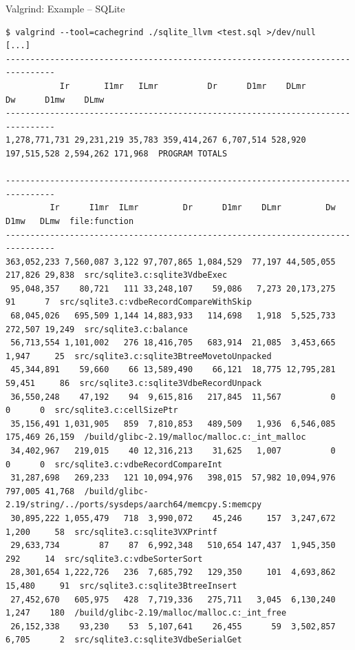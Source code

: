 \documentclass{beamer}
\begin{document}
\begin{frame}[fragile]{Valgrind: Example -- SQLite}
  \begin{lrbox}{\myv}
    \begin{minipage}{\textwidth}
\begin{verbatim}
$ valgrind --tool=cachegrind ./sqlite_llvm <test.sql >/dev/null
[...]
--------------------------------------------------------------------------------
           Ir       I1mr   ILmr          Dr      D1mr    DLmr          Dw      D1mw    DLmw
--------------------------------------------------------------------------------
1,278,771,731 29,231,219 35,783 359,414,267 6,707,514 528,920 197,515,528 2,594,262 171,968  PROGRAM TOTALS
 
--------------------------------------------------------------------------------
         Ir      I1mr  ILmr         Dr      D1mr    DLmr         Dw    D1mw   DLmw  file:function
--------------------------------------------------------------------------------
363,052,233 7,560,087 3,122 97,707,865 1,084,529  77,197 44,505,055 217,826 29,838  src/sqlite3.c:sqlite3VdbeExec
 95,048,357    80,721   111 33,248,107    59,086   7,273 20,173,275      91      7  src/sqlite3.c:vdbeRecordCompareWithSkip
 68,045,026   695,509 1,144 14,883,933   114,698   1,918  5,525,733 272,507 19,249  src/sqlite3.c:balance
 56,713,554 1,101,002   276 18,416,705   683,914  21,085  3,453,665   1,947     25  src/sqlite3.c:sqlite3BtreeMovetoUnpacked
 45,344,891    59,660    66 13,589,490    66,121  18,775 12,795,281  59,451     86  src/sqlite3.c:sqlite3VdbeRecordUnpack
 36,550,248    47,192    94  9,615,816   217,845  11,567          0       0      0  src/sqlite3.c:cellSizePtr
 35,156,491 1,031,905   859  7,810,853   489,509   1,936  6,546,085 175,469 26,159  /build/glibc-2.19/malloc/malloc.c:_int_malloc
 34,402,967   219,015    40 12,316,213    31,625   1,007          0       0      0  src/sqlite3.c:vdbeRecordCompareInt
 31,287,698   269,233   121 10,094,976   398,015  57,982 10,094,976 797,005 41,768  /build/glibc-2.19/string/../ports/sysdeps/aarch64/memcpy.S:memcpy
 30,895,222 1,055,479   718  3,990,072    45,246     157  3,247,672   1,200     58  src/sqlite3.c:sqlite3VXPrintf
 29,633,734        87    87  6,992,348   510,654 147,437  1,945,350     292     14  src/sqlite3.c:vdbeSorterSort
 28,301,654 1,222,726   236  7,685,792   129,350     101  4,693,862  15,480     91  src/sqlite3.c:sqlite3BtreeInsert
 27,452,670   605,975   428  7,719,336   275,711   3,045  6,130,240   1,247    180  /build/glibc-2.19/malloc/malloc.c:_int_free
 26,152,338    93,230    53  5,107,641    26,455      59  3,502,857   6,705      2  src/sqlite3.c:sqlite3VdbeSerialGet

\end{verbatim}
\end{minipage}
\end{lrbox}
\end{frame}
\end{document}
